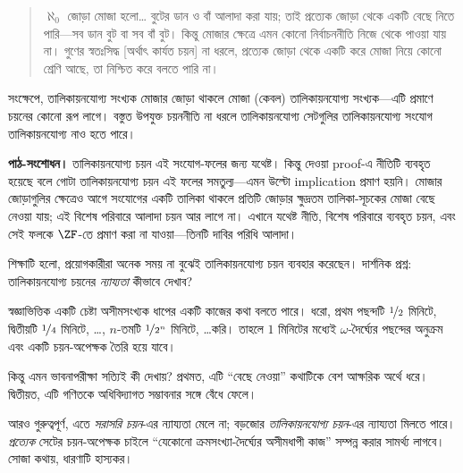 \documentclass[../../../include/open-logic-section]{subfiles}
\begin{document}
\begin{ex}
\begin{quote}
  $\aleph_0$ জোড়া মোজা হলো\dots\@
  বুটের ডান ও বাঁ আলাদা করা যায়; তাই প্রত্যেক
  জোড়া থেকে একটি বেছে নিতে পারি—সব ডান বুট
  বা সব বাঁ বুট। কিন্তু মোজার ক্ষেত্রে এমন
  কোনো নির্বাচননীতি নিজে থেকে পাওয়া যায় না।
  গুণের স্বতঃসিদ্ধ [অর্থাৎ কার্যত চয়ন] না ধরলে,
  প্রত্যেক জোড়া থেকে একটি করে মোজা নিয়ে
  কোনো শ্রেণি আছে, তা নিশ্চিত করে বলতে পারি না।
  \citep[p.~126]{Russell1919}
\end{quote}
সংক্ষেপে, তালিকায়নযোগ্য সংখ্যক মোজার জোড়া
থাকলে মোজা (কেবল) তালিকায়নযোগ্য সংখ্যক—এটি
প্রমাণে চয়নের কোনো রূপ লাগে। বস্তুত
উপযুক্ত চয়ননীতি না ধরলে তালিকায়নযোগ্য সেটগুলির তালিকায়নযোগ্য
সংযোগ তালিকায়নযোগ্য নাও হতে পারে।
\par\noindent\textbf{পাঠ-সংশোধন।} তালিকায়নযোগ্য চয়ন এই সংযোগ-ফলের জন্য যথেষ্ট। কিন্তু
দেওয়া proof-এ নীতিটি ব্যবহৃত হয়েছে বলে গোটা তালিকায়নযোগ্য
চয়ন এই ফলের সমতুল্য—এমন উল্টো implication প্রমাণ হয়নি।
মোজার জোড়াগুলির ক্ষেত্রেও আগে সংযোগের একটি তালিকা থাকলে
প্রতিটি জোড়ার ক্ষুদ্রতম তালিকা-সূচকের মোজা বেছে নেওয়া যায়;
এই বিশেষ পরিবারে আলাদা চয়ন আর লাগে না। এখানে যথেষ্ট
নীতি, বিশেষ পরিবারে ব্যবহৃত চয়ন, এবং সেই ফলকে $\ZF$-তে
প্রমাণ করা না যাওয়া—তিনটি দাবির পরিধি আলাদা।
\end{ex}

শিক্ষাটি হলো, প্রয়োগকারীরা অনেক সময় না বুঝেই
তালিকায়নযোগ্য চয়ন ব্যবহার করেছেন। দার্শনিক
প্রশ্ন: তালিকায়নযোগ্য চয়নের \emph{ন্যায্যতা}
কীভাবে দেখাব?

স্বজ্ঞাভিত্তিক একটি চেষ্টা অসীমসংখ্যক ধাপের
একটি কাজের কথা বলতে পারে। ধরো, প্রথম পছন্দটি
$\nicefrac{1}{2}$ মিনিটে, দ্বিতীয়টি
$\nicefrac{1}{4}$ মিনিটে, \dots, $n$-তমটি
$\nicefrac{1}{2^n}$ মিনিটে, \dots\@ করি।
তাহলে $1$ মিনিটের মধ্যেই $\omega$-দৈর্ঘ্যের
পছন্দের অনুক্রম এবং একটি চয়ন-অপেক্ষক তৈরি
হয়ে যাবে।

কিন্তু এমন ভাবনাপরীক্ষা সত্যিই কী দেখায়?
প্রথমত, এটি ``বেছে নেওয়া'' কথাটিকে বেশ
আক্ষরিক অর্থে ধরে। দ্বিতীয়ত, এটি গণিতকে
অধিবিদ্যাগত সম্ভাবনার সঙ্গে বেঁধে ফেলে।

আরও গুরুত্বপূর্ণ, এতে \emph{সরাসরি চয়ন}-এর
ন্যায্যতা মেলে না; বড়জোর \emph{তালিকায়নযোগ্য
চয়ন}-এর ন্যায্যতা মিলতে পারে। \emph{প্রত্যেক}
সেটের চয়ন-অপেক্ষক চাইলে ``যেকোনো
ক্রমসংখ্যা-দৈর্ঘ্যের অসীমধাপী কাজ'' সম্পন্ন করার
সামর্থ্য লাগবে। সোজা কথায়, ধারণাটি হাস্যকর।
\end{document}
